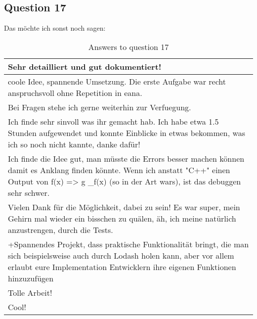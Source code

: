 \subsection*{Question 17}
\label{sub:ut_q17}
Das möchte ich sonst noch sagen:
\begin{table}[H]
  \centering
  \begin{tabularx}{\textwidth}{| X |} \hline
    Sehr detailliert und gut dokumentiert! \\ \hline 
    coole Idee, spannende Umsetzung. Die erste Aufgabe war recht anspruchsvoll ohne Repetition in eana. \\ \hline 
    Bei Fragen stehe ich gerne weiterhin zur Verfuegung.\\ \hline 
    Ich finde sehr sinvoll was ihr gemacht hab. Ich habe etwa 1.5 Stunden aufgewendet und konnte Einblicke in etwas bekommen, was ich so noch nicht kannte, danke dafür! \\ \hline
    Ich finde die Idee gut, man müsste die Errors besser machen können damit es Anklang finden könnte. Wenn ich anstatt "C++" einen Output von f(x) => g \_f(x) (so in der Art wars), ist das debuggen sehr schwer. \\ \hline
    Vielen Dank für die Möglichkeit, dabei zu sein! Es war super, mein Gehirn mal wieder ein bisschen zu quälen, äh, ich meine natürlich anzustrengen, durch die Tests. \\ \hline
    +Spannendes Projekt, dass praktische Funktionalität bringt, die man sich beispielsweise auch durch Lodash holen kann, aber vor allem erlaubt eure Implementation Entwicklern ihre eigenen Funktionen hinzuzufügen \\ \hline
    Tolle Arbeit! \\ \hline
    Cool! \\ \hline

  \end{tabularx}
  \caption{Answers to question 17}
  \label{tab:app_usertest_q17}
\end{table}
